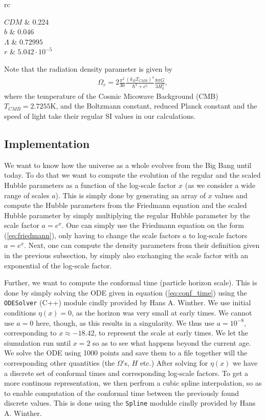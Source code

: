 \documentclass[twocolumn]{aastex62}
\begin{document}
\begin{deluxetable}{rc}
	
	\startdata
	$CDM$  &  0.224  \\
	$b$ & $0.046$  \\
	$\Lambda$ & $0.72995$   \\
	$r$ & $5.042\cdot 10^{-5}$  
	\enddata
\end{deluxetable}

Note that the radiation density parameter is given by 
\begin{align}
    \Omega_r = 2\frac{\pi^2}{30} \frac{(k_B T_{CMB})^4}{\hbar^3 + c^5}\frac{8\pi G}{3H_0^2},
\end{align}
where the temperature of the Cosmic Micowave Background (CMB) $T_{CMB} =
2.7255\mathrm{K}$, and the Boltzmann constant, reduced Planck constant and the speed of
light take their regular SI values in our calculations.

\subsection{Implementation}

We want to know how the universe as a whole evolves from the Big Bang until
today. To do that we want to compute the evolution of the regular and the scaled
Hubble parameters as a function of the log-scale factor $x$ (as we consider a wide
range of scales $a$). This is simply done by generating an array of $x$ values
and compute the Hubble parameters from the Friedmann equation
and the scaled Hubble parameter by simply multiplying the
regular Hubble parameter by the scale factor $a = e^x$. One can simply use the
Friedmann equation on the form (\ref{eq:friedmann}), only having to change the
scale factors $a$ to log-scale factors $a = e^x$. Next, one can compute the
density parameters from their definition given in the previous subsection, by
simply also exchanging the scale factor with an exponential of the log-scale
factor. 

Further, we want to compute the conformal time (particle horizon scale). This is
done by simply solving the ODE given in equation (\ref{eq:conf_time}) using the
\texttt{ODESolver} (C++) module cindly provided by Hans A. Winther. We use initial
conditions $\eta(x) = 0$, as the horizon was very small at early times. We
cannot use $a = 0$ here, though, as this results in a singularity. We thus use
$a = 10^{-8}$, corresponding to $x \approx -18.42$, to represent the scale at
early times. We let the siumulation run until $x = 2$ so as to see what happens
beyond the current age. We solve the ODE using 1000 points and save them to a
file together will the corresponding other quantities (the $\Omega$'s, $H$ etc.)
After solving for $\eta(x)$ we have a discrete set of conformal times and
corresponding log-scale factors. To get a more continous representation, we then
perfrom a cubic spline interpolation, so as to enable computation of the
conformal time between the previously found discrete values. This is done using
the \texttt{Spline} modulde cindly provided by Hans A. Winther.
\end{document}
